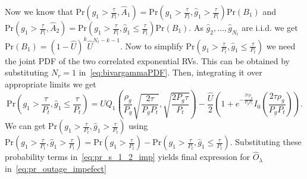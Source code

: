 \documentclass[12pt,draftcls,peerreview,onecolumn]{IEEEtran}
\newcommand{\brac}[1]{\left({#1}\right)}
\newcommand{\prob}[1]{\text{Pr}\brac{#1}}
\newcommand{\setB}{B_1}
\newcommand{\setAgthat}{\widehat{A}_1}
\newcommand{\setAlthat}{\widehat{A}_2}
\newcommand{\lam}{\lambda}
\newcommand{\Nt}{{N_t}}
\newcommand{\Nr}{{N_r}}
\newcommand{\Pt}{{P_t}}
\newcommand{\puch}{g}
\newcommand{\gk}[1]{{\puch_{#1}}}
\newcommand{\itau}{\tau}
\newcommand{\out}{O}
\newcommand{\taubypt}{\frac{\itau}{\Pt}}
\newcommand{\gkgrtaubypt}[1]{{\gk{#1}}>\taubypt}
\newcommand{\gkhatgrtaubypt}[1]{{\gkhat{#1}}>\taubypt}
\newcommand{\gkhatlttaubypt}[1]{{\gkhat{#1}}\leq\taubypt}
\newcommand{\un}{U}
\newcommand{\outhatlam}{\widehat{\out}_{\lam}}
\newcommand{\unhat}{\widehat{\un}}
\newcommand{\gpilotpower}{P_g}
\newcommand{\ghat}{\hat{\puch}}
\newcommand{\gkhat}[1]{\ghat_{#1}}
\newcommand{\rhog}{\rho_g}
\begin{document}
Now we know that  $\prob{\gkgrtaubypt{1},\setAgthat} =\prob{\gkgrtaubypt{1},\gkhatgrtaubypt{1}}\prob{\setB}$ and $\prob{\gkgrtaubypt{1},\setAlthat} =\prob{\gkgrtaubypt{1},\gkhatlttaubypt{1}}\prob{\setB}$. As $\gkhat{2},\ldots,\gkhat{\Nt}$ are i.i.d. we get $\prob{\setB}=\left(1- \unhat \right)^{k} \unhat^{\Nt-k-1} $. Now to simplify $\prob{\gkgrtaubypt{1},\gkhatlttaubypt{1}}$ we need the joint PDF of the two correlated exponential RVs. This can be obtained by substituting $\Nr=1$ in~\eqref{eq:bivargammaPDF}. Then, integrating it over appropriate limits we get 
\begin{equation}
\prob{\gkgrtaubypt{1},\gkhatlttaubypt{1}} =  \un Q_1\left(\frac{\rhog}{ \gpilotpower} \sqrt{\frac{2\itau}{ \gpilotpower\Pt}},\sqrt{\frac{2 \gpilotpower\itau}{\Pt}}\right)  - \frac{\unhat}{2} \left( 1 + e^{-\frac{2\itau\rhog}{ \gpilotpower\Pt}}I_{0}\left(\frac{2\itau\rhog}{ \gpilotpower\Pt} \right) \right).
\end{equation}
We can get $\prob{\gkgrtaubypt{1},\gkhatgrtaubypt{1}}$ using $\prob{\gkgrtaubypt{1},\gkhatgrtaubypt{1}}= \prob{\gkgrtaubypt{1}} - \prob{\gkgrtaubypt{1},\gkhatlttaubypt{1}} $. Substituting these probability terms in~\eqref{eq:pr_s_1_2_imp} yields final expression for $\outhatlam$ in~\eqref{eq:pr_outage_impefect}





%
\end{document}
